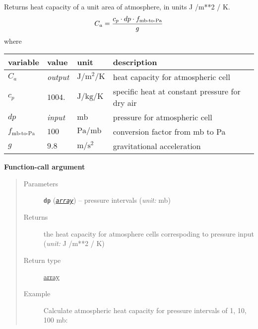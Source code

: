 \documentclass[a4paper,10pt,english]{sphinxmanual}
\begin{document}
\begin{fulllineitems}
\label{api/climlab.utils:climlab.utils.heat_capacity.atmosphere}
Returns heat capacity of a unit area of atmosphere, in units J /m**2 / K.
\begin{gather}
\begin{split}C_a = \frac{c_p \cdot dp \cdot f_{\textrm{mb-to-Pa}}}{g}\end{split}\notag
\end{gather}
where

\begin{tabulary}{\linewidth}{|L|L|L|L|}
\hline
\textsf{\relax 
variable
} & \textsf{\relax 
value
} & \textsf{\relax 
unit
} & \textsf{\relax 
description
}\\
\hline
\(C_a\)
 & 
\emph{output}
 & 
\(\textrm{J} / \textrm{m}^2 / \textrm{K}\)
 & 
heat capacity for atmospheric cell
\\
\hline
\(c_p\)
 & 
\(1004.\)
 & 
\(\textrm{J} / \textrm{kg} / \textrm{K}\)
 & 
specific heat at constant pressure for dry air
\\
\hline
\(dp\)
 & 
\emph{input}
 & 
\(\textrm{mb}\)
 & 
pressure for atmospheric cell
\\
\hline
\(f_{\textrm{mb-to-Pa}}\)
 & 
\(100\)
 & 
\(\textrm{Pa} / \textrm{mb}\)
 & 
conversion factor from mb to Pa
\\
\hline
\(g\)
 & 
\(9.8\)
 & 
\(\textrm{m} / \textrm{s}^2\)
 & 
gravitational acceleration
\\
\hline\end{tabulary}


\textbf{Function-call argument}
\begin{quote}\begin{description}
\item[{Parameters}] \leavevmode
\textbf{\texttt{dp}} (\href{http://docs.python.org/2.7/library/array.html\#module-array}{\emph{\texttt{array}}}) -- pressure intervals (\emph{unit:} mb)

\item[{Returns}] \leavevmode
the heat capacity for atmosphere cells correspoding to
pressure input (\emph{unit:} J /m**2 / K)

\item[{Return type}] \leavevmode
\href{http://docs.python.org/2.7/library/array.html\#module-array}{array}

\item[{Example}] \leavevmode
Calculate atmospheric heat capacity for pressure intervals of 
1, 10, 100 mb:


\end{description}
\end{quote}
\end{fulllineitems}
\end{document}
